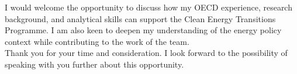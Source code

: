 \documentclass[11pt,a4paper,roman]{moderncv}
\begin{document}
\vspace{1em}
I would welcome the opportunity to discuss how my OECD experience, research background, and analytical skills can support the Clean Energy Transitions Programme. I am also keen to deepen my understanding of the energy policy context while contributing to the work of the team.\\

\vspace{1em}
Thank you for your time and consideration. I look forward to the possibility of speaking with you further about this opportunity.

\vspace{0.5cm}


\makeletterclosing
\end{document}
